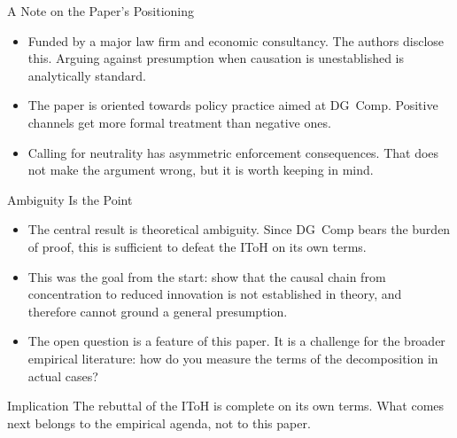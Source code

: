 \documentclass[10pt, aspectratio=169]{beamer}
\begin{document}
\begin{frame}{A Note on the Paper's Positioning}
  \begin{itemize}
    \item Funded by a major law firm and economic consultancy.
          The authors disclose this. Arguing against
          presumption when causation is unestablished
          is analytically standard.

    \item The paper is oriented towards policy practice aimed
          at DG~Comp. Positive channels
          get more formal treatment than negative ones.

    \item Calling for neutrality has asymmetric enforcement
          consequences. That does not make the argument wrong,
          but it is worth keeping in mind.
  \end{itemize}


\end{frame}


\begin{frame}{Ambiguity Is the Point}
  \begin{itemize}
    \item The central result is theoretical ambiguity.
      Since DG~Comp bears the burden of proof,
      this is sufficient to defeat the IToH
      on its own terms.
    \item This was the goal from the start: show that the
          causal chain from concentration to reduced
          innovation is not established in theory, and
          therefore cannot ground a general presumption.
    \item The open question is a feature of this paper.
          It is a challenge for the broader empirical
          literature: how do you measure the terms of
          the decomposition in actual cases?
  \end{itemize}
  \begin{alertblock}{Implication}
    The rebuttal of the IToH is complete on its own terms.
    What comes next belongs to the empirical agenda,
    not to this paper.
  \end{alertblock}
\end{frame}
\end{document}
